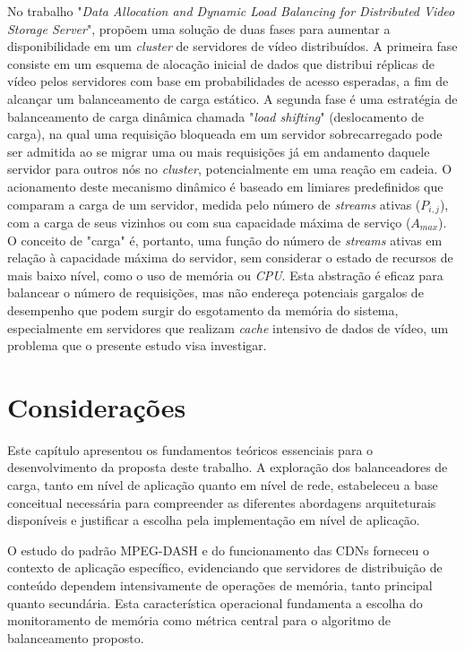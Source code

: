 No trabalho "\textit{Data Allocation and Dynamic Load Balancing for Distributed Video Storage Server}", \cite{dataAllocationAndDynamicLoadBalancingForDistributedVideoStorageServer1999} propõem uma solução de duas fases para aumentar a disponibilidade em um \textit{cluster} de servidores de vídeo distribuídos. A primeira fase consiste em um esquema de alocação inicial de dados que distribui réplicas de vídeo pelos servidores com base em probabilidades de acesso esperadas, a fim de alcançar um balanceamento de carga estático. A segunda fase é uma estratégia de balanceamento de carga dinâmica chamada "\textit{load shifting}" (deslocamento de carga), na qual uma requisição bloqueada em um servidor sobrecarregado pode ser admitida ao se migrar uma ou mais requisições já em andamento daquele servidor para outros nós no \textit{cluster}, potencialmente em uma reação em cadeia. O acionamento deste mecanismo dinâmico é baseado em limiares predefinidos que comparam a carga de um servidor, medida pelo número de \textit{streams} ativas ($P_{i,j}$), com a carga de seus vizinhos ou com sua capacidade máxima de serviço ($A_{max}$). O conceito de "carga" é, portanto, uma função do número de \textit{streams} ativas em relação à capacidade máxima do servidor, sem considerar o estado de recursos de mais baixo nível, como o uso de memória ou \textit{CPU}. Esta abstração é eficaz para balancear o número de requisições, mas não endereça potenciais gargalos de desempenho que podem surgir do esgotamento da memória do sistema, especialmente em servidores que realizam \textit{cache} intensivo de dados de vídeo, um problema que o presente estudo visa investigar.

\section{Considerações}

Este capítulo apresentou os fundamentos teóricos essenciais para o desenvolvimento da proposta deste trabalho. A exploração dos balanceadores de carga, tanto em nível de aplicação quanto em nível de rede, estabeleceu a base conceitual necessária para compreender as diferentes abordagens arquiteturais disponíveis e justificar a escolha pela implementação em nível de aplicação.

O estudo do padrão MPEG-DASH e do funcionamento das CDNs forneceu o contexto de aplicação específico, evidenciando que servidores de distribuição de conteúdo dependem intensivamente de operações de memória, tanto principal quanto secundária. Esta característica operacional fundamenta a escolha do monitoramento de memória como métrica central para o algoritmo de balanceamento proposto.

